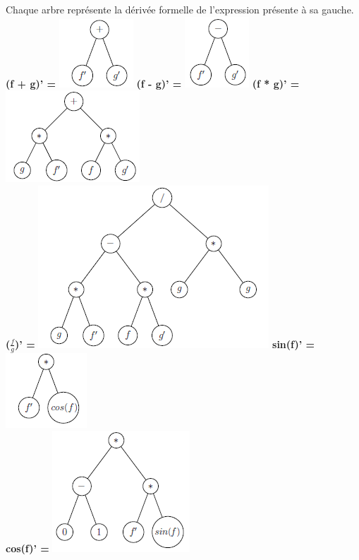 \documentclass[10pt,a4paper]{article}
\begin{document}
Chaque arbre représente la dérivée formelle de l'expression présente à sa gauche.\\

\textbf{(f + g)' =} \includegraphics[scale=1]{q9-f+g.png}
\textbf{(f - g)' =} \includegraphics[scale=1]{q9-f-g.png}
\textbf{(f * g)' =} \includegraphics[scale=1]{q9-fg.png} \\
\textbf{($\frac{f}{g}$)' =} \includegraphics[scale=1]{q9-fdivg.png}
\textbf{sin(f)' =} \includegraphics[scale=1]{q9-sinf.png} \\
\textbf{cos(f)' =} \includegraphics[scale=1]{q9-cosf.png}
\end{document}
